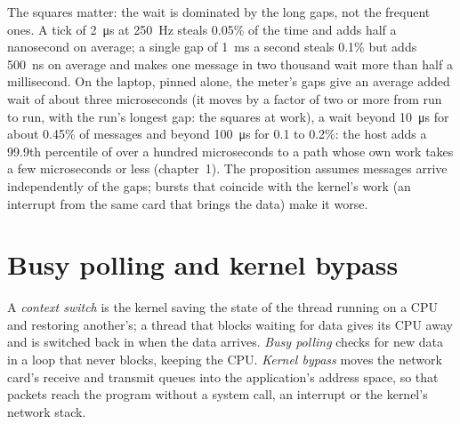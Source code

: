 The squares matter: the wait is dominated by the long gaps, not the frequent ones. A tick of \qty{2}{\micro\second} at
250~Hz steals 0.05\% of the time and adds half a nanosecond on average; a single gap of \qty{1}{\milli\second} a second steals
0.1\% but adds \qty{500}{\nano\second} on average and makes one message in two thousand wait more than half a millisecond.
On the laptop, pinned alone, the meter's gaps give an average added wait of about three microseconds (it moves by a factor
of two or more from run to run, with the run's longest gap: the squares at work), a wait beyond \qty{10}{\micro\second}
for about 0.45\% of messages and beyond \qty{100}{\micro\second} for 0.1 to 0.2\%: the host adds a 99.9th percentile of
over a hundred microseconds to a path whose own work takes a few microseconds or less (chapter~1). The proposition assumes messages arrive
independently of the gaps; bursts that coincide with the kernel's work (an interrupt from the same card that brings the
data) make it worse.

\section{Busy polling and kernel bypass}

\begin{definition}\label{def:ll:linux-tuning:polling}
A \emph{context switch} is the kernel saving the state of the thread running on a CPU and restoring
another's; a thread that blocks waiting for data gives its CPU away and is switched back in when the data arrives. \emph{Busy
polling} checks for new data in a loop that never blocks, keeping the CPU. \emph{Kernel
bypass} moves the network card's receive and transmit queues into the application's address space, so
that packets reach the program without a system call, an interrupt or the kernel's network stack.
\end{definition}

